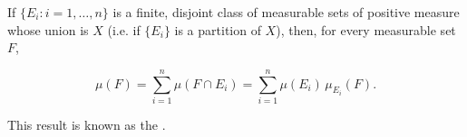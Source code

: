 If $\{E_i : i = 1, \dots, n\}$ is a finite, disjoint class of measurable sets of positive measure whose union is $X$ (i.e. if $\{E_i\}$ is a partition of $X$), then, for every measurable set $F$,

$$\mu(F) = \sum_{i=1}^{n} \mu(F \cap E_i) = \sum_{i=1}^{n} \mu(E_i) \, \mu_{E_i}(F).$$

This result is known as the .
